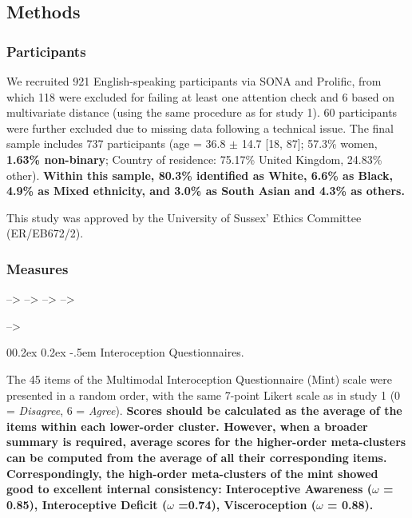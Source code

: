\documentclass[
  man,
  floatsintext,
  longtable,
  nolmodern,
  notxfonts,
  notimes,
  mask,
  colorlinks=true,linkcolor=blue,citecolor=blue,urlcolor=blue]{apa7}
\makeatletter
\renewcommand{\paragraph}{\@startsection{paragraph}{4}{\parindent}%
	{0\baselineskip \@plus 0.2ex \@minus 0.2ex}%
	{-.5em}%
	{\normalfont\normalsize\bfseries\typesectitle}}
\makeatother
\begin{document}
\subsection{Methods}\label{methods-1}

\subsubsection{Participants}\label{participants-1}

We recruited 921 English-speaking participants via SONA and
Prolific\textcopyright, from which 118 were excluded for failing at
least one attention check and 6 based on multivariate distance (using
the same procedure as for study 1). 60 participants were further
excluded due to missing data following a technical issue. The final
sample includes 737 participants (age = 36.8 \(\pm\) 14.7 {[}18, 87{]};
57.3\% women, \textbf{1.63\% non-binary}; Country of residence: 75.17\%
United Kingdom, 24.83\% other). \textbf{Within this sample, 80.3\%
identified as White, 6.6\% as Black, 4.9\% as Mixed ethnicity, and 3.0\%
as South Asian and 4.3\% as others.}

This study was approved by the University of Sussex' Ethics Committee
(ER/EB672/2).

\subsubsection{Measures}\label{measures}

--\textgreater{} --\textgreater{} --\textgreater{} --\textgreater{}

--\textgreater{}

\paragraph{Interoception
Questionnaires.}\label{interoception-questionnaires}

The 45 items of the Multimodal Interoception Questionnaire (Mint) scale
were presented in a random order, with the same 7-point Likert scale as
in study 1 (0 = \emph{Disagree}, 6 = \emph{Agree}). \textbf{Scores
should be calculated as the average of the items within each lower-order
cluster. However, when a broader summary is required, average scores for
the higher-order meta-clusters can be computed from the average of all
their corresponding items. Correspondingly, the high-order meta-clusters
of the mint showed good to excellent internal consistency: Interoceptive
Awareness (\(\omega\) = 0.85), Interoceptive Deficit (\(\omega\) =0.74),
Visceroception (\(\omega\) = 0.88).}
\end{document}
